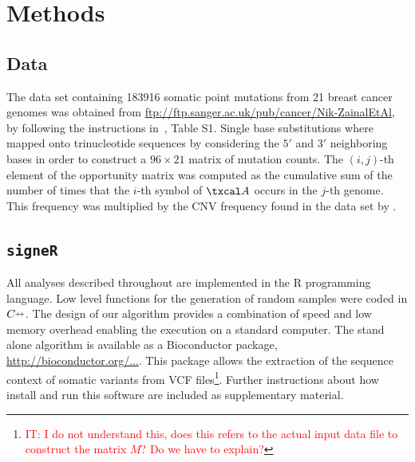 \documentclass{bioinfo}
\newcommand{\CC}{C\nolinebreak\hspace{-.05em}\raisebox{.4ex}{\tiny +}\nolinebreak\hspace{-.15em}\raisebox{.4ex}{\tiny +}}
\begin{document}
\section{Methods}
\subsection{Data} The data set containing 183916 somatic point
mutations from 21 breast cancer genomes was obtained from
\url{ftp://ftp.sanger.ac.uk/pub/cancer/Nik-ZainalEtAl}, by
following the instructions in~\cite{NCell}, Table S1. Single base 
substitutions where mapped onto trinucleotide sequences by considering
the $5'$ and $3'$ neighboring bases in order to construct a $96\times
21$ matrix of mutation counts. The $(i,j)$-th element of the
opportunity matrix was computed as the cumulative sum of the number of
times that the $i$-th symbol of $\txcal A$ occurs in the $j$-th
genome. This frequency was multiplied by the CNV frequency
found in the data set by \cite{NCell}.

\subsection{\texttt{signeR}}
All analyses described throughout are implemented in the R programming 
language. Low level functions for the generation of random
samples were coded in $\CC$. The design of our algorithm provides a
combination of speed and low memory overhead enabling the execution on
a standard computer. The stand alone algorithm is available as a
Bioconductor package, \url{http://bioconductor.org/...}. 
This package allows the extraction of the sequence context of somatic
variants from VCF files\footnote{\textcolor{red}{IT: I do not
understand this, does this refers to the actual input data file to
construct the matrix $M$? Do we have to explain?}}. Further
instructions about how install and run this software are included as 
supplementary material.
\end{document}
